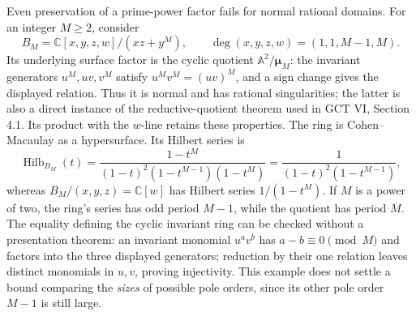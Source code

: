 Even preservation of a prime-power factor fails for normal rational
domains. For an integer $M\ge2$, consider
\[
 B_M=\mathbb C[x,y,z,w]/(xz+y^M),\qquad
 \deg(x,y,z,w)=(1,1,M-1,M).
 \tag{P-F20d}
\]
Its underlying surface factor is the cyclic quotient
$\mathbb A^2/\boldsymbol\mu_M$: the invariant generators
$u^M,uv,v^M$ satisfy $u^Mv^M=(uv)^M$, and a sign change gives
the displayed relation. Thus it is normal and has rational
singularities; the latter is also a direct instance of the
reductive-quotient theorem used in GCT VI, Section 4.1. Its
product with the $w$-line retains these properties. The ring is
Cohen--Macaulay as a hypersurface. Its Hilbert series is
\[
 \operatorname{Hilb}_{B_M}(t)
  =\frac{1-t^M}
     {(1-t)^2(1-t^{M-1})(1-t^M)}
  =\frac1{(1-t)^2(1-t^{M-1})},
\]
whereas $B_M/(x,y,z)=\mathbb C[w]$ has Hilbert series
$1/(1-t^M)$. If $M$ is a power of two, the ring's series has
odd period $M-1$, while the quotient has period $M$.
The equality defining the cyclic invariant ring can be checked
without a presentation theorem: an invariant monomial $u^av^b$
has $a-b\equiv0\pmod M$ and factors into the three displayed
generators; reduction by their one relation leaves distinct
monomials in $u,v$, proving injectivity. This example does not
settle a bound comparing the \emph{sizes} of possible pole orders,
since its other pole order $M-1$ is still large.

